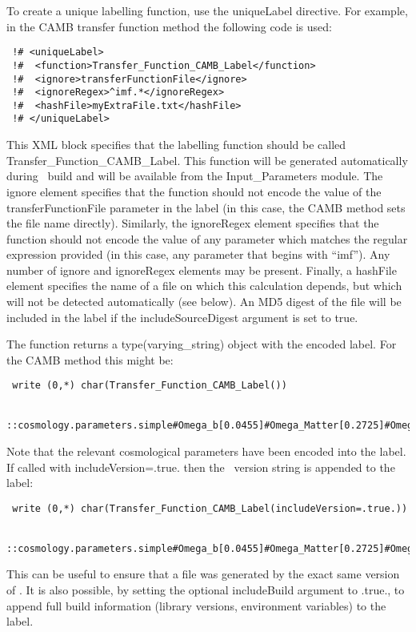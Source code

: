 To create a unique labelling function, use the {\normalfont \ttfamily uniqueLabel} directive. For example, in the {\normalfont \ttfamily CAMB} transfer function method the following code is used:
\begin{verbatim}
 !# <uniqueLabel>
 !#  <function>Transfer_Function_CAMB_Label</function>
 !#  <ignore>transferFunctionFile</ignore>
 !#  <ignoreRegex>^imf.*</ignoreRegex>
 !#  <hashFile>myExtraFile.txt</hashFile>
 !# </uniqueLabel>
\end{verbatim}
This XML block specifies that the labelling function should be called {\normalfont \ttfamily Transfer\_Function\_CAMB\_Label}. This function will be generated automatically during \glc\ build and will be available from the {\normalfont \ttfamily Input\_Parameters} module. The {\normalfont \ttfamily ignore} element specifies that the function should not encode the value of the {\normalfont \ttfamily transferFunctionFile} parameter in the label (in this case, the {\normalfont \ttfamily CAMB} method sets the file name directly). Similarly, the {\normalfont \ttfamily ignoreRegex} element specifies that the function should not encode the value of any parameter which matches the regular expression provided (in this case, any parameter that begins with ``{\normalfont \ttfamily imf}''). Any number of {\normalfont \ttfamily ignore} and {\normalfont \ttfamily ignoreRegex} elements may be present. Finally, a {\normalfont \ttfamily hashFile} element specifies the name of a file on which this calculation depends, but which will not be detected automatically (see below). An MD5 digest of the file will be included in the label if the {\normalfont \ttfamily includeSourceDigest} argument is set to true.

The function returns a {\normalfont \ttfamily type(varying\_string)} object with the encoded label. For the {\normalfont \ttfamily CAMB} method this might be:
\begin{verbatim}
 write (0,*) char(Transfer_Function_CAMB_Label())
 
 ::cosmology.parameters.simple#Omega_b[0.0455]#Omega_Matter[0.2725]#Omega_DE[0.7275]#T_CMB[2.72548]#H_0[70.2]
\end{verbatim}
Note that the relevant cosmological parameters have been encoded into the label. If called with {\normalfont \ttfamily includeVersion=.true.} then the \glc\ version string is appended to the label:
\begin{verbatim}
 write (0,*) char(Transfer_Function_CAMB_Label(includeVersion=.true.))
 
 ::cosmology.parameters.simple#Omega_b[0.0455]#Omega_Matter[0.2725]#Omega_DE[0.7275]#T_CMB[2.72548]#H_0[70.2]_v0.9.3.r2022
\end{verbatim}
This can be useful to ensure that a file was generated by the exact same version of \glc. It is also possible, by setting the optional {\normalfont \ttfamily includeBuild} argument to {\normalfont \ttfamily .true.}, to append full build information (library versions, environment variables) to the label.


